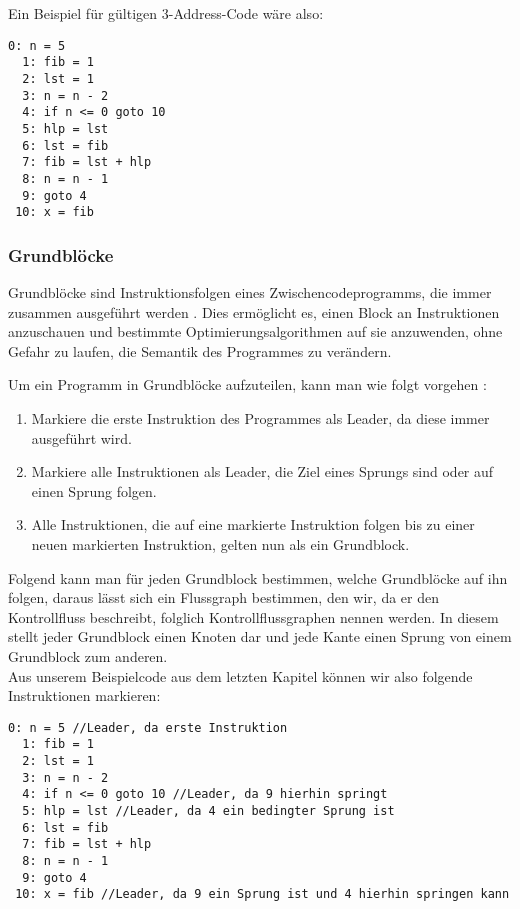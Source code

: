 Ein Beispiel für gültigen 3-Address-Code wäre also:
\begin{lstlisting}[caption={3-Address-Code, der die 5-te Fibonacci Zahl ausrechnet und in x speichert}]
  0: n = 5
  1: fib = 1  
  2: lst = 1
  3: n = n - 2
  4: if n <= 0 goto 10
  5: hlp = lst 
  6: lst = fib
  7: fib = lst + hlp
  8: n = n - 1
  9: goto 4
 10: x = fib
\end{lstlisting}


\subsubsection{Grundblöcke} \label{t:bb}
Grundblöcke sind Instruktionsfolgen eines Zwischencodeprogramms,
die immer zusammen ausgeführt werden \cite[S.619]{D}.
Dies ermöglicht es, einen Block an Instruktionen anzuschauen 
und bestimmte Optimierungsalgorithmen auf sie anzuwenden, 
ohne Gefahr zu laufen, die Semantik des Programmes zu verändern.

\newpage
Um ein Programm in Grundblöcke aufzuteilen, kann man wie folgt vorgehen \cite[S.643]{D}:
\begin{enumerate}
  \item Markiere die erste Instruktion des Programmes als Leader, da diese immer ausgeführt wird.
  \item Markiere alle Instruktionen als Leader, die Ziel eines Sprungs sind oder auf einen Sprung folgen.
  \item Alle Instruktionen, die auf eine markierte Instruktion folgen
    bis zu einer neuen markierten Instruktion, gelten nun als ein Grundblock.
\end{enumerate}

Folgend kann man für jeden Grundblock bestimmen, welche Grundblöcke auf ihn folgen, 
daraus lässt sich ein Flussgraph bestimmen, den wir, da er den Kontrollfluss beschreibt,
folglich Kontrollflussgraphen nennen werden. In diesem stellt jeder Grundblock einen Knoten dar
und jede Kante einen Sprung von einem Grundblock zum anderen.\\

Aus unserem Beispielcode aus dem letzten Kapitel können wir also folgende Instruktionen markieren:
\begin{lstlisting}[caption=Fibonacci 3-Address-Code mit markierten Leadern]
  0: n = 5 //Leader, da erste Instruktion
  1: fib = 1  
  2: lst = 1
  3: n = n - 2
  4: if n <= 0 goto 10 //Leader, da 9 hierhin springt
  5: hlp = lst //Leader, da 4 ein bedingter Sprung ist
  6: lst = fib
  7: fib = lst + hlp
  8: n = n - 1
  9: goto 4
 10: x = fib //Leader, da 9 ein Sprung ist und 4 hierhin springen kann
\end{lstlisting}

